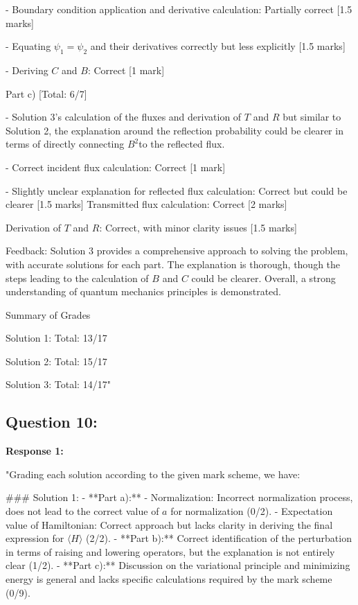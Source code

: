 \documentclass[a4paper,11pt]{article}
\begin{document}
- Boundary condition application and derivative calculation: Partially correct [1.5 marks]

- Equating  \(\psi_1 = \psi_2\) and their derivatives correctly but less explicitly [1.5 marks]

- Deriving \(C\) and \(B\): Correct [1 mark]

Part c) [Total: 6/7]

- Solution 3's calculation of the fluxes and derivation of \(T\) and \(R\) but similar to Solution 2, the explanation around the reflection probability could be clearer in terms of directly connecting \(B^2\)to the reflected flux.

- Correct incident flux calculation: Correct [1 mark]

- Slightly unclear explanation for reflected flux calculation: Correct but could be clearer [1.5 marks]
Transmitted flux calculation: Correct [2 marks]

Derivation of \(T\) and \(R\): Correct, with minor clarity issues [1.5 marks]

Feedback: Solution 3 provides a comprehensive approach to solving the problem, with accurate solutions for each part. The explanation is thorough, though the steps leading to the calculation of \(B\) and \(C\) could be clearer. Overall, a strong understanding of quantum mechanics principles is demonstrated.

Summary of Grades

Solution 1: Total: 13/17

Solution 2: Total: 15/17

Solution 3: Total: 14/17"

\subsection*{Question 10:}

\textbf{Response 1:}

"Grading each solution according to the given mark scheme, we have:

### Solution 1:
- **Part a):**
    - Normalization: Incorrect normalization process, does not lead to the correct value of \(a\) for normalization (0/2).
    - Expectation value of Hamiltonian: Correct approach but lacks clarity in deriving the final expression for \(\langle H \rangle\) (2/2).
- **Part b):** Correct identification of the perturbation in terms of raising and lowering operators, but the explanation is not entirely clear (1/2).
- **Part c):** Discussion on the variational principle and minimizing energy is general and lacks specific calculations required by the mark scheme (0/9).
\end{document}
